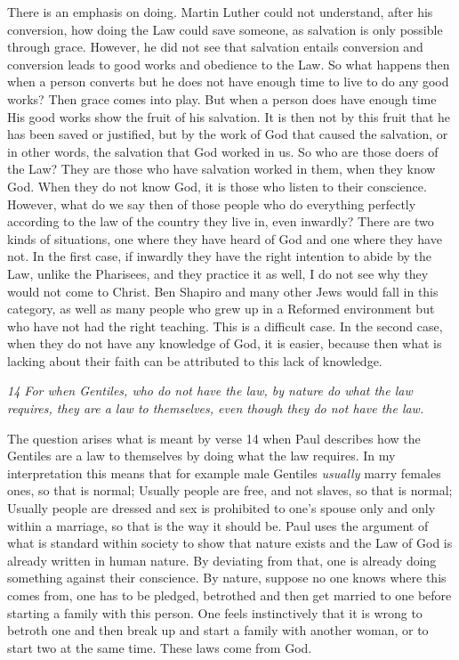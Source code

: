 There is an emphasis on doing. Martin Luther could not understand, after
his conversion, how doing the Law could save someone, as salvation is
only possible through grace. However, he did not see that salvation
entails conversion and conversion leads to good works and obedience to
the Law. So what happens then when a person converts but he does not
have enough time to live to do any good works? Then grace comes into
play. But when a person does have enough time His good works show the
fruit of his salvation. It is then not by this fruit that he has been
saved or justified, but by the work of God that caused the salvation, or
in other words, the salvation that God worked in us. So who are those
doers of the Law? They are those who have salvation worked in them, when
they know God. When they do not know God, it is those who listen to
their conscience. However, what do we say then of those people who do
everything perfectly according to the law of the country they live in,
even inwardly? There are two kinds of situations, one where they have
heard of God and one where they have not. In the first case, if inwardly
they have the right intention to abide by the Law, unlike the Pharisees,
and they practice it as well, I do not see why they would not come to
Christ. Ben Shapiro and many other Jews would fall in this category, as
well as many people who grew up in a Reformed environment but who have
not had the right teaching. This is a difficult case. In the second
case, when they do not have any knowledge of God, it is easier, because
then what is lacking about their faith can be attributed to this lack of
knowledge.

\emph{14 For when Gentiles, who do not have the law, by nature do what
the law requires, they are a law to themselves, even though they do not
have the law.}

The question arises what is meant by verse 14 when Paul describes how
the Gentiles are a law to themselves by doing what the law requires. In
my interpretation this means that for example male Gentiles
\emph{usually} marry females ones, so that is normal; Usually people are
free, and not slaves, so that is normal; Usually people are dressed and
sex is prohibited to one's spouse only and only within a marriage, so
that is the way it should be. Paul uses the argument of what is standard
within society to show that nature exists and the Law of God is already
written in human nature. By deviating from that, one is already doing
something against their conscience. By nature, suppose no one knows
where this comes from, one has to be pledged, betrothed and then get
married to one before starting a family with this person. One feels
instinctively that it is wrong to betroth one and then break up and
start a family with another woman, or to start two at the same time.
These laws come from God.


